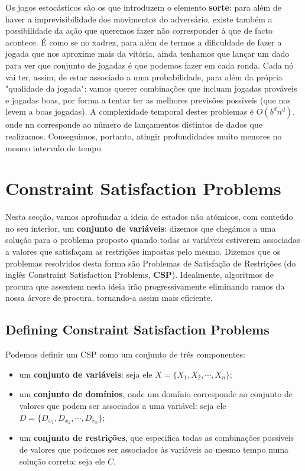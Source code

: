 \documentclass[11pt]{article}
\begin{document}
Os jogos estocásticos são os que introduzem o elemento \textbf{sorte}: para além de haver a imprevisibilidade dos movimentos do adversário, existe também a possibilidade da ação que queremos fazer não corresponder à que de facto acontece. É como se no xadrez, para além de termos a dificuldade de fazer a jogada que nos aproxime mais da vitória, ainda tenhamos que lançar um dado para ver que conjunto de jogadas é que podemos fazer em cada ronda. Cada nó vai ter, assim, de estar associado a uma probabilidade, para além da própria "qualidade da jogada": vamos querer combinações que incluam jogadas prováveis e jogadas boas, por forma a tentar ter as melhores previsões possíveis (que nos levem a boas jogadas). A complexidade temporal destes problemas é $O(b^dn^d)$, onde nn corresponde ao número de lançamentos distintos de dados que realizamos. Conseguimos, portanto, atingir profundidades muito menores no mesmo intervalo de tempo.

\newpage
\section{Constraint Satisfaction Problems}

Nesta secção, vamos aprofundar a ideia de estados não atómicos, com conteúdo no seu interior, um \textbf{conjunto de variáveis}: dizemos que chegámos a uma solução para o problema proposto quando todas as variáveis estiverem associadas a valores que satisfaçam as restrições impostas pelo mesmo. Dizemos que os problemas resolvidos desta forma são Problemas de Satisfação de Restrições (do inglês Constraint Satisfaction Problems, \textbf{CSP}). Idealmente, algoritmos de procura que assentem nesta ideia irão progressivamente eliminando ramos da nossa árvore de procura, tornando-a assim mais eficiente.

\subsection{Defining Constraint Satisfaction Problems}

Podemos definir um CSP como um conjunto de três componentes:
\begin{itemize}[itemsep=0pt]
    \item um \textbf{conjunto de variáveis}: seja ele $X=\{X_1,X_2,\cdots,X_n\}$;
    \item um \textbf{conjunto de domínios}, onde um domínio corresponde ao conjunto de valores que podem ser associados a uma variável: seja ele $D=\{D_{x_1},D_{x_2},\cdots,D_{x_n}\}$;
    \item um \textbf{conjunto de restrições}, que especifica todas as combinações possíveis de valores que podemos ser associados às variáveis ao mesmo tempo numa solução correta: seja ele $C$.
\end{itemize}
\end{document}
